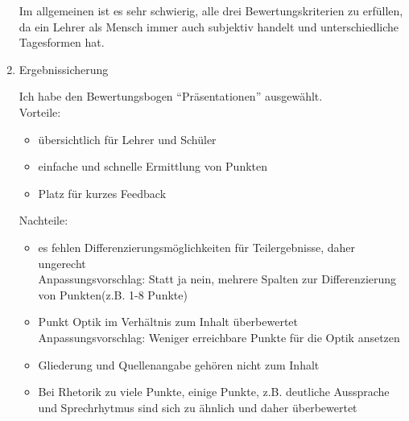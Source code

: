\documentclass[12pt]{scrartcl}
\begin{document}
\begin{enumerate}
  Im allgemeinen ist es sehr schwierig, alle drei Bewertungskriterien zu erfüllen, da ein Lehrer als Mensch immer auch subjektiv handelt und unterschiedliche Tagesformen hat.

  \item Ergebnissicherung

  Ich habe den Bewertungsbogen \enquote{Präsentationen} ausgewählt.\\
  Vorteile:
  \begin{itemize}
    \item übersichtlich für Lehrer und Schüler
    \item  einfache und schnelle Ermittlung von Punkten
    \item Platz für kurzes Feedback
  \end{itemize}
  Nachteile:
  \begin{itemize}
    \item es fehlen Differenzierungsmöglichkeiten für Teilergebnisse, daher ungerecht\\
      Anpassungsvorschlag: Statt ja nein, mehrere Spalten zur Differenzierung von Punkten(z.B. 1-8 Punkte)
      \item Punkt Optik im Verhältnis zum Inhalt überbewertet\\
      Anpassungsvorschlag: Weniger erreichbare Punkte für die Optik ansetzen
      \item Gliederung und Quellenangabe gehören nicht zum Inhalt
      \item Bei Rhetorik zu viele Punkte, einige Punkte, z.B. deutliche Aussprache und Sprechrhytmus sind sich zu ähnlich und daher überbewertet
  \end{itemize}
\end{enumerate}
\end{document}
